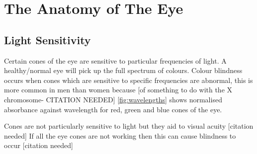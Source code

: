
\chapter{The Anatomy of The Eye}

\label{anatomy} %


\section{Light Sensitivity}

Certain cones of the eye are sensitive to particular frequencies of light.
A healthy/normal eye will pick up the full spectrum of colours. Colour blindness
occurs when cones which are sensitive to specific frequencies are abnormal, this
is more common in men than women because [of something to do with the X
chromosome- CITATION NEEDED] \ref{fig:wavelengths} shows normalised absorbance
against wavelength for red, green and blue cones of the eye.

Cones are not particularly sensitive to light but they aid to visual acuity
[citation needed] If all the eye cones are not working then this can cause
blindness to occur [citation needed]

